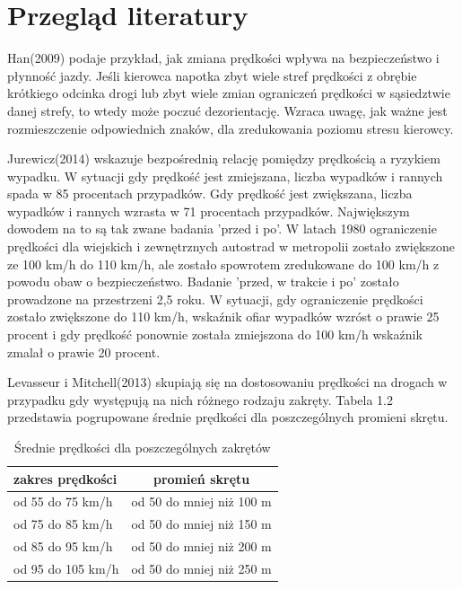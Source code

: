 \section{Przegląd literatury}
\label{sec:przegladLiteratury}	

Han(2009) podaje przykład, jak zmiana prędkości wpływa na bezpieczeństwo i płynność jazdy. Jeśli kierowca napotka zbyt wiele stref prędkości z obrębie krótkiego odcinka drogi lub zbyt wiele zmian ograniczeń prędkości w sąsiedztwie danej strefy, to wtedy może poczuć dezorientację. Wzraca uwagę, jak ważne jest rozmieszczenie odpowiednich znaków, dla zredukowania poziomu stresu kierowcy.

Jurewicz(2014) wskazuje bezpośrednią relację pomiędzy prędkością a ryzykiem wypadku. W sytuacji gdy prędkość jest zmiejszana,  liczba wypadków i rannych spada w 85 procentach przypadków. Gdy prędkość jest zwiększana, liczba wypadków i rannych wzrasta w 71 procentach przypadków. Największym dowodem na to są tak zwane badania 'przed i po'. W latach 1980 ograniczenie prędkości dla wiejskich i zewnętrznych autostrad w metropolii zostało zwiększone ze 100 km/h do 110 km/h, ale zostało spowrotem zredukowane do 100 km/h z powodu obaw o bezpieczeństwo. Badanie 'przed, w trakcie i po' zostało prowadzone na przestrzeni 2,5 roku. W sytuacji, gdy ograniczenie prędkości zostało zwiększone do 110 km/h, wskaźnik ofiar wypadków wzróst o prawie 25 procent i gdy prędkość ponownie została zmiejszona do 100 km/h wskaźnik zmalał o prawie 20 procent.

	Levasseur i Mitchell(2013) skupiają się na dostosowaniu prędkości na drogach w przypadku gdy występują na nich różnego rodzaju zakręty. Tabela 1.2 przedstawia pogrupowane średnie prędkości dla poszczególnych promieni skrętu.
	
\begin{table}[ht]
\centering
\caption{Średnie prędkości dla poszczególnych zakrętów}
\label{my-label}
\begin{tabular}{| l | c |}
\hline
\textbf{zakres prędkości}                    & \textbf{promień skrętu} \\ \hline
od 55 do 75 km/h          & od 50 do mniej niż 100 m \\ \hline
od 75 do 85 km/h          & od 50 do mniej niż 150 m  \\ \hline
od 85 do 95 km/h  &  od 50 do mniej niż 200 m\\ \hline
od 95 do 105 km/h  &  od 50 do mniej niż 250 m\\ \hline

\end{tabular}
\end{table}



